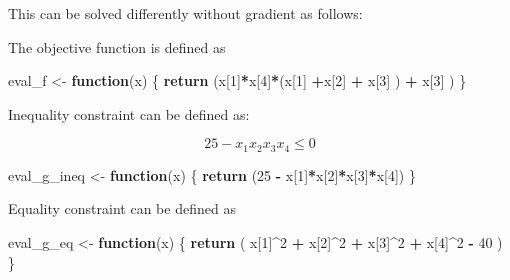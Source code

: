 \documentclass[onecolumn]{article}
\newenvironment{Shaded}{\begin{snugshade}}{\end{snugshade}}
\newcommand{\KeywordTok}[1]{\textcolor[rgb]{0.13,0.29,0.53}{\textbf{#1}}}
\newcommand{\DecValTok}[1]{\textcolor[rgb]{0.00,0.00,0.81}{#1}}
\newcommand{\StringTok}[1]{\textcolor[rgb]{0.31,0.60,0.02}{#1}}
\newcommand{\ControlFlowTok}[1]{\textcolor[rgb]{0.13,0.29,0.53}{\textbf{#1}}}
\newcommand{\OperatorTok}[1]{\textcolor[rgb]{0.81,0.36,0.00}{\textbf{#1}}}
\newcommand{\NormalTok}[1]{#1}
\begin{document}
This can be solved differently without gradient as follows:

The objective function is defined as

\begin{Shaded}
\begin{Highlighting}[]
\NormalTok{eval_f <-}\StringTok{ }\ControlFlowTok{function}\NormalTok{(x)}
\NormalTok{\{}
    \KeywordTok{return}\NormalTok{ (x[}\DecValTok{1}\NormalTok{]}\OperatorTok{*}\NormalTok{x[}\DecValTok{4}\NormalTok{]}\OperatorTok{*}\NormalTok{(x[}\DecValTok{1}\NormalTok{] }\OperatorTok{+}\NormalTok{x[}\DecValTok{2}\NormalTok{] }\OperatorTok{+}\StringTok{ }\NormalTok{x[}\DecValTok{3}\NormalTok{] ) }\OperatorTok{+}\StringTok{ }\NormalTok{x[}\DecValTok{3}\NormalTok{] )}
\NormalTok{\}}
\end{Highlighting}
\end{Shaded}

Inequality constraint can be defined as:

\[
25 - x_1 x_2 x_3 x_4 \leq 0
\]

\begin{Shaded}
\begin{Highlighting}[]
\NormalTok{eval_g_ineq <-}\StringTok{ }\ControlFlowTok{function}\NormalTok{(x)}
\NormalTok{\{}
    \KeywordTok{return}\NormalTok{ (}\DecValTok{25} \OperatorTok{-}\StringTok{ }\NormalTok{x[}\DecValTok{1}\NormalTok{]}\OperatorTok{*}\NormalTok{x[}\DecValTok{2}\NormalTok{]}\OperatorTok{*}\NormalTok{x[}\DecValTok{3}\NormalTok{]}\OperatorTok{*}\NormalTok{x[}\DecValTok{4}\NormalTok{])}
\NormalTok{\}}
\end{Highlighting}
\end{Shaded}

Equality constraint can be defined as

\begin{Shaded}
\begin{Highlighting}[]
\NormalTok{eval_g_eq <-}\StringTok{ }\ControlFlowTok{function}\NormalTok{(x)}
\NormalTok{\{}
    \KeywordTok{return}\NormalTok{ ( x[}\DecValTok{1}\NormalTok{]}\OperatorTok{^}\DecValTok{2} \OperatorTok{+}\StringTok{ }\NormalTok{x[}\DecValTok{2}\NormalTok{]}\OperatorTok{^}\DecValTok{2} \OperatorTok{+}\StringTok{ }\NormalTok{x[}\DecValTok{3}\NormalTok{]}\OperatorTok{^}\DecValTok{2} \OperatorTok{+}\StringTok{ }\NormalTok{x[}\DecValTok{4}\NormalTok{]}\OperatorTok{^}\DecValTok{2} \OperatorTok{-}\StringTok{ }\DecValTok{40}\NormalTok{ )}
\NormalTok{\}}
\end{Highlighting}
\end{Shaded}
\end{document}
